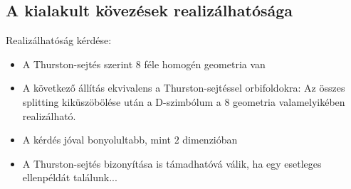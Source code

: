 \subsection{A kialakult kövezések realizálhatósága}
\begin{frame}
  Realizálhatóság kérdése:
  \begin{itemize}
    \item A Thurston-sejtés szerint 8 féle homogén geometria van
    \item A következő állítás ekvivalens a Thurston-sejtéssel orbifoldokra: Az
      összes splitting kiküszöbölése után a D-szimbólum a 8 geometria
      valamelyikében realizálható.
    \item A kérdés jóval bonyolultabb, mint $2$ dimenzióban
    \item A Thurston-sejtés bizonyítása is támadhatóvá válik, ha egy
      esetleges ellenpéldát találunk...
  \end{itemize}
\end{frame}


